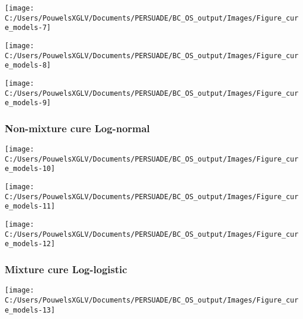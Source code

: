 \documentclass[
]{article}
\begin{document}
\begin{flushleft}\texttt{[image: C:/Users/PouwelsXGLV/Documents/PERSUADE/BC\_OS\_output/Images/Figure\_cure\_models-7]} \end{flushleft}

\begin{flushleft}\texttt{[image: C:/Users/PouwelsXGLV/Documents/PERSUADE/BC\_OS\_output/Images/Figure\_cure\_models-8]} \end{flushleft}

\begin{flushleft}\texttt{[image: C:/Users/PouwelsXGLV/Documents/PERSUADE/BC\_OS\_output/Images/Figure\_cure\_models-9]} \end{flushleft}

\clearpage

\subsubsection{Non-mixture cure
Log-normal}\label{non-mixture-cure-log-normal}

\begin{flushleft}\texttt{[image: C:/Users/PouwelsXGLV/Documents/PERSUADE/BC\_OS\_output/Images/Figure\_cure\_models-10]} \end{flushleft}

\begin{flushleft}\texttt{[image: C:/Users/PouwelsXGLV/Documents/PERSUADE/BC\_OS\_output/Images/Figure\_cure\_models-11]} \end{flushleft}

\begin{flushleft}\texttt{[image: C:/Users/PouwelsXGLV/Documents/PERSUADE/BC\_OS\_output/Images/Figure\_cure\_models-12]} \end{flushleft}

\clearpage

\subsubsection{Mixture cure
Log-logistic}\label{mixture-cure-log-logistic}

\begin{flushleft}\texttt{[image: C:/Users/PouwelsXGLV/Documents/PERSUADE/BC\_OS\_output/Images/Figure\_cure\_models-13]} \end{flushleft}
\end{document}
